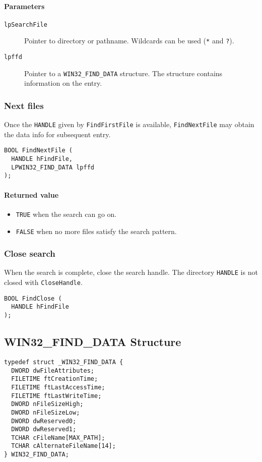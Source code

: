 \paragraph{Parameters}
\begin{description}
\item [\texttt{lpSearchFile}] Pointer to directory or pathname. Wildcards can be used (\texttt{*} and \texttt{?}).
\item [\texttt{lpffd}] Pointer to a \texttt{WIN32\_FIND\_DATA} structure. The structure contains information on the entry.
\end{description}

\subsubsection{Next files}
Once the \texttt{HANDLE} given by \texttt{FindFirstFile} is available, \texttt{FindNextFile} may obtain the data info for subsequent entry.

\begin{verbatim}
BOOL FindNextFile (
  HANDLE hFindFile,
  LPWIN32_FIND_DATA lpffd
);
\end{verbatim}

\paragraph{Returned value}
\begin{itemize}
\item \texttt{TRUE} when the search can go on.
\item \texttt{FALSE} when no more files satisfy the search pattern.
\end{itemize}

\subsubsection{Close search}
When the search is complete, close the search handle. The directory \texttt{HANDLE} is not closed with \texttt{CloseHandle}.
\begin{verbatim}
BOOL FindClose (
  HANDLE hFindFile
);
\end{verbatim}

\subsection{WIN32\_FIND\_DATA Structure}
\begin{verbatim}
typedef struct _WIN32_FIND_DATA {
  DWORD dwFileAttributes;
  FILETIME ftCreationTime;
  FILETIME ftLastAccessTime;
  FILETIME ftLastWriteTime;
  DWORD nFileSizeHigh;
  DWORD nFileSizeLow;
  DWORD dwReserved0;
  DWORD dwReserved1;
  TCHAR cFileName[MAX_PATH];
  TCHAR cAlternateFileName[14];
} WIN32_FIND_DATA;
\end{verbatim}

